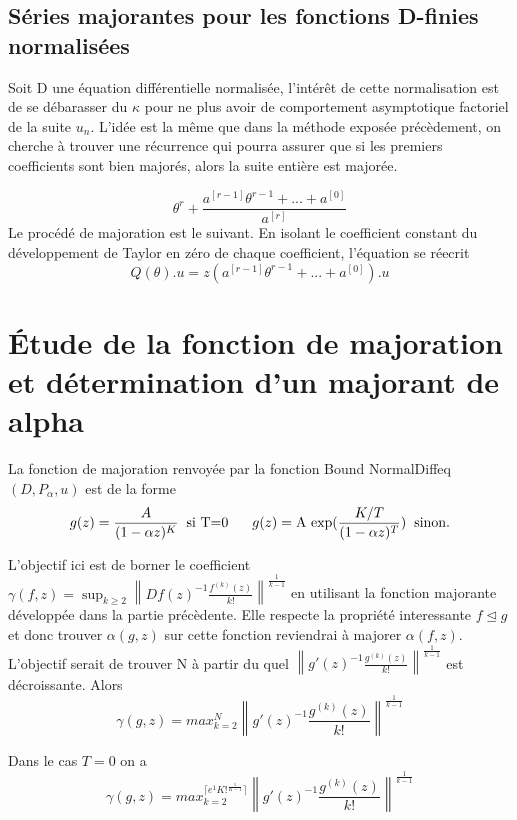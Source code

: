 \documentclass[a4paper,10.5pt]{article}
\begin{document}
	\subsection{Séries majorantes pour les fonctions D-finies normalisées}
	
	Soit D une équation différentielle normalisée, l'intérêt de cette normalisation est de se débarasser du $\kappa$ pour ne plus avoir de comportement asymptotique factoriel de la suite $u_n$. L'idée est la même que dans la méthode exposée précèdement, on cherche à trouver une récurrence qui pourra assurer que si les premiers coefficients sont bien majorés, alors la suite entière est majorée.
	
	\[\theta^{r}+\frac{a^{[r-1]}\theta^{r-1}+...+a^{[0]}}{a^{[r]}}\]
	Le procédé de majoration est le suivant. En isolant le coefficient constant du développement de Taylor en zéro de chaque coefficient, l'équation se réecrit
	\[Q(\theta).u=z(a^{[r-1]}\theta^{r-1}+...+a^{[0]}).u\]
	
	
	\newpage
	
	
	
	\section{Étude de la fonction de majoration et détermination d'un majorant de alpha}
	La fonction de majoration renvoyée par la fonction Bound NormalDiffeq$(D,P_{\alpha},u)$  est de la  forme
	\[g(z)=\frac{A}{(1-\alpha z)^{K}} \hspace{2mm}\text{si T=0}\hspace{6mm} g(z)=\text{A exp}(\frac{K/T}{(1-\alpha z)^{T}}) \hspace{2mm} \text{sinon.} \]
	
	\noindent L'objectif ici est de borner le coefficient $\gamma(f,z)=\sup_{k \geq 2} \left\|Df(z)^{-1}\frac{f^{(k)}(z)}{k!}\right\|^{\frac{1}{k-1}}$ en utilisant la fonction majorante développée dans la partie précèdente. Elle respecte la propriété interessante $f\unlhd g$ et donc trouver $\alpha(g,z)$ sur cette fonction reviendrai à majorer $\alpha(f,z)$. L'objectif serait de trouver N à partir du quel $\left\|g'(z)^{-1}\frac{g^{(k)}(z)}{k!}\right\|^{\frac{1}{k-1}}$ est décroissante. Alors 
	\[\gamma(g,z)=max_{k=2}^{N}\left\|g'(z)^{-1}\frac{g^{(k)}(z)}{k!}\right\|^{\frac{1}{k-1}}\] 
	
	\begin{proposition} Dans le cas $T=0$ on a \[\gamma(g,z)=max_{k=2}^{\lceil e^{1}K!^{\frac{1}{K-1}} \rceil}\left\|g'(z)^{-1}\frac{g^{(k)}(z)}{k!}\right\|^{\frac{1}{k-1}}\]
	\end{proposition}
\end{document}
